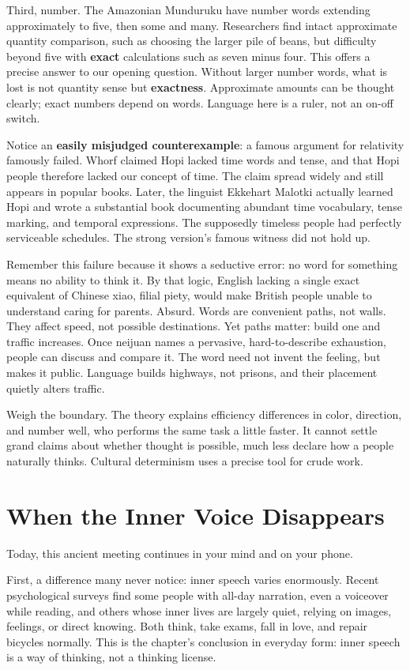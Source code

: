 Third, number. The Amazonian Munduruku have number words extending approximately to five, then some and many. Researchers find intact approximate quantity comparison, such as choosing the larger pile of beans, but difficulty beyond five with \textbf{exact} calculations such as seven minus four. This offers a precise answer to our opening question. Without larger number words, what is lost is not quantity sense but \textbf{exactness}. Approximate amounts can be thought clearly; exact numbers depend on words. Language here is a ruler, not an on-off switch.

Notice an \textbf{easily misjudged counterexample}: a famous argument for relativity famously failed. Whorf claimed Hopi lacked time words and tense, and that Hopi people therefore lacked our concept of time. The claim spread widely and still appears in popular books. Later, the linguist Ekkehart Malotki actually learned Hopi and wrote a substantial book documenting abundant time vocabulary, tense marking, and temporal expressions. The supposedly timeless people had perfectly serviceable schedules. The strong version's famous witness did not hold up.

Remember this failure because it shows a seductive error: no word for something means no ability to think it. By that logic, English lacking a single exact equivalent of Chinese xiao, filial piety, would make British people unable to understand caring for parents. Absurd. Words are convenient paths, not walls. They affect speed, not possible destinations. Yet paths matter: build one and traffic increases. Once neijuan names a pervasive, hard-to-describe exhaustion, people can discuss and compare it. The word need not invent the feeling, but makes it public. Language builds highways, not prisons, and their placement quietly alters traffic.

Weigh the boundary. The theory explains efficiency differences in color, direction, and number well, who performs the same task a little faster. It cannot settle grand claims about whether thought is possible, much less declare how a people naturally thinks. Cultural determinism uses a precise tool for crude work.

\section{When the Inner Voice Disappears}
Today, this ancient meeting continues in your mind and on your phone.

First, a difference many never notice: inner speech varies enormously. Recent psychological surveys find some people with all-day narration, even a voiceover while reading, and others whose inner lives are largely quiet, relying on images, feelings, or direct knowing. Both think, take exams, fall in love, and repair bicycles normally. This is the chapter's conclusion in everyday form: inner speech is a way of thinking, not a thinking license.

